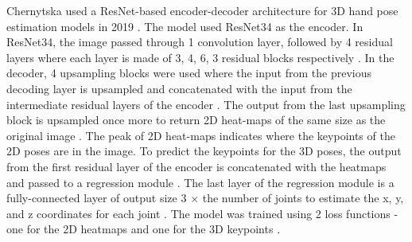\noindent
Chernytska used a ResNet-based encoder-decoder architecture for 3D hand pose estimation models in 2019 \cite{olha}. The model used ResNet34 as the encoder. In ResNet34, the image passed through 1 convolution layer, followed by 4 residual layers where each layer is made of 3, 4, 6, 3 residual blocks respectively \cite{resnet}. In the decoder, 4 upsampling blocks were used where the input from the previous decoding layer is upsampled and concatenated with the input from the intermediate residual layers of the encoder \cite{olha}. The output from the last upsampling block is upsampled once more to return 2D heat-maps of the same size as the original image \cite{olha}. The peak of 2D heat-maps indicates where the keypoints of the 2D poses are in the image. To predict the keypoints for the 3D poses, the output from the first residual layer of the encoder is concatenated with the heatmaps and passed to a regression module \cite{olha}. The last layer of the regression module is a fully-connected layer of output size 3 \(\times\) the number of joints to estimate the x, y, and z coordinates for each joint \cite{olha}. The model was trained using 2 loss functions - one for the 2D heatmaps and one for the 3D keypoints \cite{olha}.

